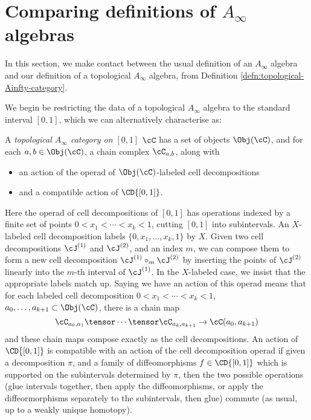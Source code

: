 
\section{Comparing definitions of $A_\infty$ algebras}
\label{sec:comparing-A-infty}
In this section, we make contact between the usual definition of an $A_\infty$ algebra and our definition of a topological $A_\infty$ algebra, from Definition \ref{defn:topological-Ainfty-category}.

We begin be restricting the data of a topological $A_\infty$ algebra to the standard interval $[0,1]$, which we can alternatively characterise as:
\begin{defn}
A \emph{topological $A_\infty$ category on $[0,1]$} $\cC$ has a set of objects $\Obj(\cC)$, and for each $a,b \in \Obj(\cC)$, a chain complex $\cC_{a,b}$, along with
\begin{itemize}
\item an action of the operad of $\Obj(\cC)$-labeled cell decompositions
\item and a compatible action of $\CD{[0,1]}$.
\end{itemize}
\end{defn}
Here the operad of cell decompositions of $[0,1]$ has operations indexed by a finite set of points $0 < x_1< \cdots < x_k < 1$, cutting $[0,1]$ into subintervals. An $X$-labeled cell decomposition labels $\{0, x_1, \ldots, x_k, 1\}$ by $X$. Given two cell decompositions $\cJ^{(1)}$ and $\cJ^{(2)}$, and an index $m$, we can compose them to form a new cell decomposition $\cJ^{(1)} \circ_m \cJ^{(2)}$ by inserting the points of $\cJ^{(2)}$ linearly into the $m$-th interval of $\cJ^{(1)}$. In the $X$-labeled case, we insist that the appropriate labels match up. Saying we have an action of this operad means that for each labeled cell decomposition $0 < x_1< \cdots < x_k < 1$, $a_0, \ldots, a_{k+1} \subset \Obj(\cC)$, there is a chain map $$\cC_{a_0,a_1} \tensor \cdots \tensor \cC_{a_k,a_{k+1}} \to \cC(a_0,a_{k+1})$$ and these chain maps compose exactly as the cell decompositions.
An action of $\CD{[0,1]}$ is compatible with an action of the cell decomposition operad if given a decomposition $\pi$, and a family of diffeomorphisms $f \in \CD{[0,1]}$ which is supported on the subintervals determined by $\pi$, then the two possible operations (glue intervals together, then apply the diffeomorphisms, or apply the diffeormorphisms separately to the subintervals, then glue) commute (as usual, up to a weakly unique homotopy).

